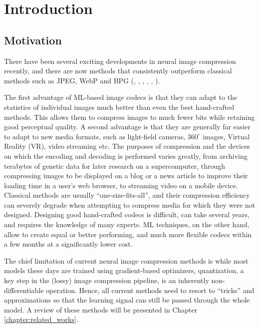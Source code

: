 \chapter{Introduction}

\section{Motivation}
\par
There have been several exciting developments in neural image compression
recently, and there are now methods that consistently outperform classical methods
such as JPEG, WebP and BPG (\cite{toderici2017full}, \cite{theis2017lossy},
\cite{rippel2017real}, \cite{balle2018variational}, \cite{johnston2018cvpr},
\cite{mentzer2018cvpr}).

\par
The first advantage of ML-based image codecs is that they can adapt to the
statistics of individual images much better than even the best hand-crafted
methods. This allows them to compress images to much fewer bits while retaining good
perceptual quality. A second advantage is that they are generally far easier to
adapt to new media formats, such as light-field cameras, $360^\circ$ images,
Virtual Reality (VR), video streaming etc. The purposes of compression and the
devices on which the encoding and decoding is performed varies greatly, from
archiving terabytes of genetic data for later research on a supercomputer,
through compressing images to be displayed on a blog or a news article to
improve their loading time in a user's web browser, to
streaming video on a mobile device. Classical methods are usually
``one-size-fits-all'', and their compression efficiency can severely degrade when
attempting to compress media for which they were not designed. Designing good
hand-crafted codecs is difficult, can take several years, and
requires the knowledge of many experts. ML techniques, on the other hand, allow to
create equal or better performing, and much more flexible codecs within a few
months at a significantly lower cost.

\par
The chief limitation of current neural image compression methods is while most
models these days are trained using gradient-based optimizers, quantization, a
key step in the (lossy) image compression pipeline, is an inherently
non-differentiable operation. Hence, all current methods need to resort to
``tricks'' and approximations so that the learning signal can still be passed
through the whole model. A review of these methods will be presented in Chapter 
\ref{chapter:related_works}.

